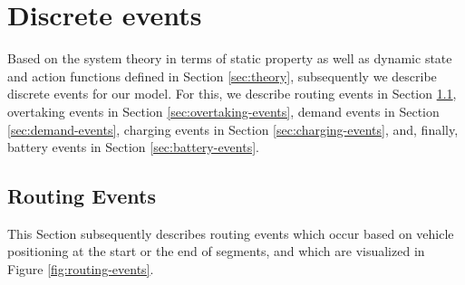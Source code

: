 \documentclass[graybox]{svmult}
\begin{document}

\vspace{-2mm}

\section{Discrete events}
\label{sec:events}
Based on the system theory in terms of static property as well as dynamic state and action functions defined in Section \ref{sec:theory}, subsequently we describe discrete events for our model. For this, we describe routing events in Section \ref{sec:routing-events}, overtaking events in Section \ref{sec:overtaking-events}, demand events in Section \ref{sec:demand-events}, charging events in Section \ref{sec:charging-events}, and, finally, battery events in Section \ref{sec:battery-events}.
\vspace{-2mm}

\subsection{Routing Events}
\label{sec:routing-events}
This Section subsequently describes routing events which occur based on vehicle positioning at the start or the end of segments, and which are visualized in Figure \ref{fig:routing-events}. 
\end{document}
